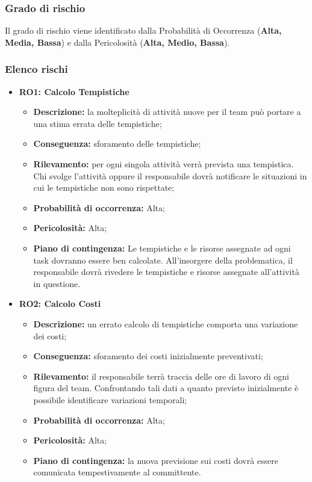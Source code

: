 \subsubsection{Grado di rischio}
Il grado di rischio viene identificato dalla Probabilità di Occorrenza (\textbf{Alta, Media, Bassa}) e dalla Pericolosità (\textbf{Alta, Medio, Bassa}).
\subsubsection{Elenco rischi}
\begin{itemize}
	\item \textbf{RO1: Calcolo Tempistiche}
	\begin{itemize}
		\item \textbf{Descrizione:} la molteplicità di attività nuove per il team può portare a una stima errata delle tempistiche;
		\item \textbf{Conseguenza:} sforamento delle tempistiche;
		\item \textbf{Rilevamento:} per ogni singola attività verrà prevista una tempistica. Chi svolge l'attività oppure il responsabile dovrà notificare le situazioni in cui le tempistiche non sono rispettate;
		\item \textbf{Probabilità di occorrenza:} Alta;
		\item \textbf{Pericolosità:} Alta;
		\item \textbf{Piano di contingenza:} Le tempistiche e le risorse assegnate ad ogni task dovranno essere ben calcolate. All'insorgere della problematica, il responsabile dovrà rivedere le tempistiche e risorse assegnate all'attività in questione.
	\end{itemize}
	
	\item \textbf{RO2: Calcolo Costi}
	\begin{itemize}
		\item \textbf{Descrizione:} un errato calcolo di tempistiche comporta una variazione dei costi;
		\item \textbf{Conseguenza:} sforamento dei costi inizialmente preventivati;
		\item \textbf{Rilevamento:} il responsabile terrà traccia delle ore di lavoro di ogni figura del team. Confrontando tali dati a quanto previsto inizialmente è possibile identificare variazioni temporali;
		\item \textbf{Probabilità di occorrenza:} Alta;
		\item \textbf{Pericolosità:} Alta;
		\item \textbf{Piano di contingenza:} la nuova previsione sui costi dovrà essere comunicata tempestivamente al committente.
	\end{itemize}
	

\end{itemize}
